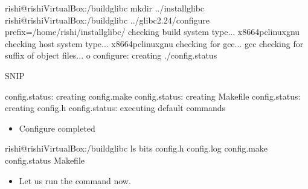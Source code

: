 \documentclass[letterpaper,10pt,english]{sphinxmanual}
\begin{document}
\begin{sphinxVerbatim}[commandchars=\\\{\}]
rishi@rishi\PYGZhy{}VirtualBox:\PYGZti{}/build\PYGZus{}glibc\PYGZdl{} mkdir ../install\PYGZus{}glibc
rishi@rishi\PYGZhy{}VirtualBox:\PYGZti{}/build\PYGZus{}glibc\PYGZdl{} ../glibc\PYGZhy{}2.24/configure \PYGZhy{}\PYGZhy{}prefix=/home/rishi/install\PYGZus{}glibc/
checking build system type... x86\PYGZus{}64\PYGZhy{}pc\PYGZhy{}linux\PYGZhy{}gnu
checking host system type... x86\PYGZus{}64\PYGZhy{}pc\PYGZhy{}linux\PYGZhy{}gnu
checking for gcc... gcc
checking for suffix of object files... o
configure: creating ./config.status

\PYGZgt{}\PYGZgt{}\PYGZgt{}\PYGZgt{}\PYGZgt{}\PYGZgt{}\PYGZgt{}SNIP\PYGZlt{}\PYGZlt{}\PYGZlt{}\PYGZlt{}\PYGZlt{}\PYGZlt{}\PYGZlt{}\PYGZlt{}\PYGZlt{}\PYGZlt{}\PYGZlt{}\PYGZlt{}

config.status: creating config.make
config.status: creating Makefile
config.status: creating config.h
config.status: executing default commands
\end{sphinxVerbatim}
\begin{itemize}
\item {} 
Configure completed

\end{itemize}

\begin{sphinxVerbatim}[commandchars=\\\{\}]
rishi@rishi\PYGZhy{}VirtualBox:\PYGZti{}/build\PYGZus{}glibc\PYGZdl{} ls
bits  config.h  config.log  config.make  config.status  Makefile
\end{sphinxVerbatim}
\begin{itemize}
\item {} 
Let us run the  command now.

\end{itemize}
\end{document}
